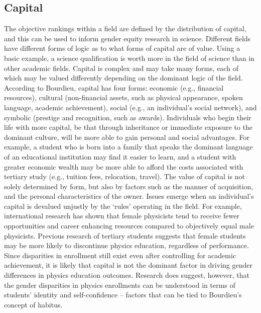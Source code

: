 \subsection*{Capital}
The objective rankings within a field are defined by the distribution of capital, and this can be used to inform gender equity research in science.\cite{Kelly_1985} Different fields have different forms of logic as to what forms of capital are of value. Using a basic example, a science qualification is worth more in the field of science than in other academic fields. Capital is complex and may take many forms, each of which may be valued differently depending on the dominant logic of the field. According to Bourdieu\cite{Bourdieu_1986}, capital has four forms: economic (e.g., financial resources), cultural (non-financial assets, such as physical appearance, spoken language, academic achievement), social (e.g., an individual's social network), and symbolic (prestige and recognition, such as awards). Individuals who begin their life with more capital, be that through inheritance or immediate exposure to the dominant culture, will be more able to gain personal and social advantages. For example, a student who is born into a family that speaks the dominant language of an educational institution may find it easier to learn, and a student with greater economic wealth may be more able to afford the costs associated with tertiary study (e.g., tuition fees, relocation, travel). The value of capital is not solely determined by form, but also by factors such as the manner of acquisition, and the personal characteristics of the owner. Issues emerge when an individual's capital is devalued unjustly by the `rules' operating in the field. For example, international research has shown that female physicists tend to receive fewer opportunities and career enhancing resources compared to objectively equal male physicists.\cite{Ivie_2013} Previous research of tertiary students suggests that female students may be more likely to discontinue physics education, regardless of performance.\cite{Ellis_2016,Ost_2010} Since disparities in enrollment still exist even after controlling for academic achievement, it is likely that capital is not the dominant factor in driving gender differences in physics education outcomes. Research does suggest, however, that the gender disparities in physics enrollments can be understood in terms of students' identity\cite{Brown2010,Hazari_2010,Hazari2013,Brewe_2016,Hazari2017} and self-confidence\cite{Litzler2014,Concannon2009,Sharma_2011,Beth_Kurtz_Costes_2008,Sawtelle_2012} -- factors that can be tied to Bourdieu's concept of habitus.

